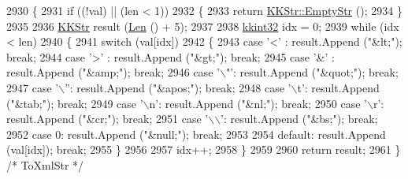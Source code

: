 \begin{DoxyCode}
2930 \{
2931   \textcolor{keywordflow}{if}  ((!val)  ||  (len < 1))
2932   \{
2933     \textcolor{keywordflow}{return} \hyperlink{class_k_k_b_1_1_k_k_str_ab6e416b3ef54ef632bd10c3f7a2f7994}{KKStr::EmptyStr} ();
2934   \}
2935   
2936   \hyperlink{class_k_k_b_1_1_k_k_str}{KKStr}  result (\hyperlink{class_k_k_b_1_1_k_k_str_a869142d4855517c5c237afcb25dbbe36}{Len} () + 5);
2937   
2938   \hyperlink{namespace_k_k_b_a8fa4952cc84fda1de4bec1fbdd8d5b1b}{kkint32}  idx = 0;
2939   \textcolor{keywordflow}{while}  (idx < len)
2940   \{
2941     \textcolor{keywordflow}{switch}  (val[idx])
2942     \{
2943       \textcolor{keywordflow}{case}  \textcolor{charliteral}{'<'} : result.Append (\textcolor{stringliteral}{"&lt;"});    \textcolor{keywordflow}{break};
2944       \textcolor{keywordflow}{case}  \textcolor{charliteral}{'>'} : result.Append (\textcolor{stringliteral}{"&gt;"});    \textcolor{keywordflow}{break};
2945       \textcolor{keywordflow}{case}  \textcolor{charliteral}{'&'} : result.Append (\textcolor{stringliteral}{"&amp;"});   \textcolor{keywordflow}{break};
2946       \textcolor{keywordflow}{case}  \textcolor{charliteral}{'\(\backslash\)"'}: result.Append (\textcolor{stringliteral}{"&quot;"});  \textcolor{keywordflow}{break};
2947       \textcolor{keywordflow}{case}  \textcolor{charliteral}{'\(\backslash\)''}: result.Append (\textcolor{stringliteral}{"&apos;"});  \textcolor{keywordflow}{break};
2948       \textcolor{keywordflow}{case}  \textcolor{charliteral}{'\(\backslash\)t'}: result.Append (\textcolor{stringliteral}{"&tab;"});   \textcolor{keywordflow}{break};
2949       \textcolor{keywordflow}{case}  \textcolor{charliteral}{'\(\backslash\)n'}: result.Append (\textcolor{stringliteral}{"&nl;"});    \textcolor{keywordflow}{break};
2950       \textcolor{keywordflow}{case}  \textcolor{charliteral}{'\(\backslash\)r'}: result.Append (\textcolor{stringliteral}{"&cr;"});    \textcolor{keywordflow}{break};
2951       \textcolor{keywordflow}{case}  \textcolor{charliteral}{'\(\backslash\)\(\backslash\)'}: result.Append (\textcolor{stringliteral}{"&bs;"});    \textcolor{keywordflow}{break};
2952       \textcolor{keywordflow}{case}     0: result.Append (\textcolor{stringliteral}{"&null;"});  \textcolor{keywordflow}{break};
2953          
2954       \textcolor{keywordflow}{default}:   result.Append (val[idx]);   \textcolor{keywordflow}{break};
2955     \}
2956 
2957     idx++;
2958   \}
2959 
2960   \textcolor{keywordflow}{return}  result;
2961 \}  \textcolor{comment}{/* ToXmlStr */}
\end{DoxyCode}

